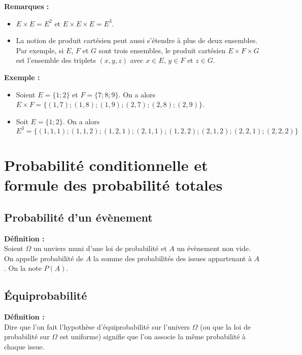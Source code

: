\documentclass{article}
\begin{document}
\textbf{Remarques :}
\begin{itemize}
	\item $E\times E = E^2$ et $E\times E\times E = E^3$.
	\item La notion de produit cartésien peut aussi s'étendre à plus de deux ensembles. Par exemple, si $E$, $F$ et $G$
	      sont trois ensembles, le produit cartésien $E\times F\times G$ est l'ensemble des triplets $(x, y, z)$ avec $x\in E$,
	      $y\in F$ et $z\in G$.
\end{itemize}

\textbf{Exemple :}
\begin{itemize}
	\item Soient $E=\{1;2\}$ et $F=\{ 7;8;9 \}$. On a alors $E\times F = \{ (1,7) ; (1,8) ; (1,9) ; (2,7) ; (2,8) ; (2,9) \}$.
	\item Soit $E=\{1;2\}$. On a alors $E^3 = \{  (1,1,1) ; (1,1,2) ; (1,2,1) ; (2,1,1) ; (1,2,2) ; (2,1,2) ; (2,2,1) ; (2,2,2)  \}$
\end{itemize}

\section{Probabilité conditionnelle et formule des probabilité totales}

\subsection{Probabilité d'un évènement}

\begin{mdframed}[style=definitionStyle]
	\textbf{Définition :} ~\\
	Soient $\Omega$ un unviers muni d'une loi de probabilité et $A$ un évènement non vide.\\
	On appelle probabilité de $A$ la somme des probabilités des issues appartenant à $A$. On la note $P(A)$.
\end{mdframed}

\subsection{Équiprobabilité}

\begin{mdframed}[style=definitionStyle]
	\textbf{Définition :} ~\\
	Dire que l'on fait l'hypothèse d'équiprobabilité sur l'univers $\Omega$ (ou que la loi de probabilité sur $\Omega$
	est uniforme) signifie que l'on associe la même probabilité à chaque issue.
\end{mdframed}
\end{document}
